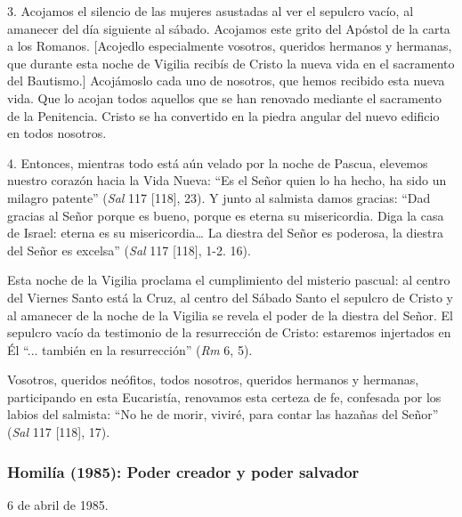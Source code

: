 			\begin{body}3. Acojamos el silencio de las mujeres asustadas al ver el sepulcro vacío, al amanecer del día siguiente al sábado. Acojamos este grito del Apóstol de la carta a los Romanos. [Acojedlo especialmente vosotros, queridos hermanos y hermanas, que durante esta noche de Vigilia recibís de Cristo la nueva vida en el sacramento del Bautismo.] Acojámoslo cada uno de nosotros, que hemos recibido esta nueva vida. Que lo acojan todos aquellos que se han renovado mediante el sacramento de la Penitencia. Cristo se ha convertido en la piedra angular del nuevo edificio en todos nosotros. \end{body}
			
			\begin{body}4. Entonces, mientras todo está aún velado por la noche de Pascua, elevemos nuestro corazón hacia la Vida Nueva: “Es el Señor quien lo ha hecho, ha sido un milagro patente” (\textit{Sal }117 [118], 23). Y junto al salmista damos gracias: “Dad gracias al Señor porque es bueno, porque es eterna su misericordia. Diga la casa de Israel: eterna es su misericordia… La diestra del Señor es poderosa, la diestra del Señor es excelsa” (\textit{Sal} 117 [118], 1-2. 16). \end{body}
			
			\begin{body}Esta noche de la Vigilia proclama el cumplimiento del misterio pascual: al centro del Viernes Santo está la Cruz, al centro del Sábado Santo el sepulcro de Cristo y al amanecer de la noche de la Vigilia se revela el poder de la diestra del Señor. El sepulcro vacío da testimonio de la resurrección de Cristo: estaremos injertados en Él “... también en la resurrección” (\textit{Rm} 6, 5). \end{body}
			
			\begin{body}Vosotros, queridos neófitos, todos nosotros, queridos hermanos y hermanas, participando en esta Eucaristía, renovamos esta certeza de fe, confesada por los labios del salmista: “No he de morir, viviré, para contar las hazañas del Señor” (\textit{Sal} 117 [118], 17).\end{body}
			
			\subsubsection{Homilía (1985): Poder creador y poder salvador}
			
			\begin{referencia}6 de abril de 1985.\end{referencia}
			
